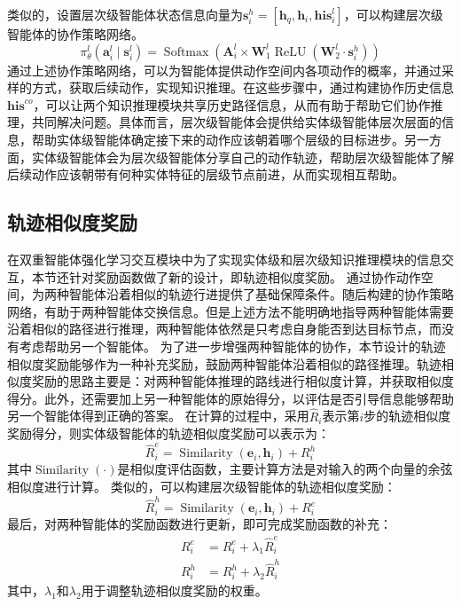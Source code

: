 \documentclass[algorithmlist, AutoFakeBold, AutoFakeSlant, figurelist, tablelist, nomlist, masters]{seuthesix}
\begin{document}
类似的，设置层次级智能体状态信息向量为$\bm{s}_i^{h} = \left[\bm{h}_q, \bm{h}_i, \bm{his}_i^l\right]$，可以构建层次级智能体的协作策略网络。
\begin{equation}
  \pi_\theta^l\left(\bm{a}_i^l \mid \bm{s}_i^l\right) =\operatorname{Softmax}\left(\bm{A}_i^l \times \mathbf{W}_1^l \operatorname{ReLU}\left(\mathbf{W}_2^l \cdot \bm{s}_i^{h}\right)\right)
\end{equation}
通过上述协作策略网络，可以为智能体提供动作空间内各项动作的概率，并通过采样的方式，获取后续动作，实现知识推理。在这些步骤中，通过构建协作历史信息$\bm{his}^{co}$，可以让两个知识推理模块共享历史路径信息，从而有助于帮助它们协作推理，共同解决问题。具体而言，层次级智能体会提供给实体级智能体层次层面的信息，帮助实体级智能体确定接下来的动作应该朝着哪个层级的目标进步。另一方面，实体级智能体会为层次级智能体分享自己的动作轨迹，帮助层次级智能体了解后续动作应该朝带有何种实体特征的层级节点前进，从而实现相互帮助。

\subsection{轨迹相似度奖励}
在双重智能体强化学习交互模块中为了实现实体级和层次级知识推理模块的信息交互，本节还针对奖励函数做了新的设计，即轨迹相似度奖励。
通过协作动作空间，为两种智能体沿着相似的轨迹行进提供了基础保障条件。随后构建的协作策略网络，有助于两种智能体交换信息。但是上述方法不能明确地指导两种智能体需要沿着相似的路径进行推理，两种智能体依然是只考虑自身能否到达目标节点，而没有考虑帮助另一个智能体。
为了进一步增强两种智能体的协作，本节设计的轨迹相似度奖励能够作为一种补充奖励，鼓励两种智能体沿着相似的路径推理。轨迹相似度奖励的思路主要是：对两种智能体推理的路线进行相似度计算，并获取相似度得分。此外，还需要加上另一种智能体的原始得分，以评估是否引导信息能够帮助另一个智能体得到正确的答案。
在计算的过程中，采用$\hat{R}_i$表示第$i$步的轨迹相似度奖励得分，则实体级智能体的轨迹相似度奖励可以表示为：
\begin{equation}
  \hat{R}_i^e = \operatorname{Similarity}(\bm{e}_i, \bm{h}_i) + R_i^h
\end{equation}
其中$\operatorname{Similarity}(\cdot)$是相似度评估函数，主要计算方法是对输入的两个向量的余弦相似度进行计算。
类似的，可以构建层次级智能体的轨迹相似度奖励：
\begin{equation}
  \hat{R}_i^h = \operatorname{Similarity}(\bm{e}_i, \bm{h}_i) + R_i^e
\end{equation}
最后，对两种智能体的奖励函数进行更新，即可完成奖励函数的补充：
\begin{equation}
  \begin{aligned}
    R_i^e &= R_i^e + \lambda_1 \hat{R}_i^e \\
    R_i^h &= R_i^h + \lambda_2 \hat{R}_i^h
  \end{aligned}
\end{equation}
其中，$\lambda_1$和$\lambda_2$用于调整轨迹相似度奖励的权重。
\end{document}
